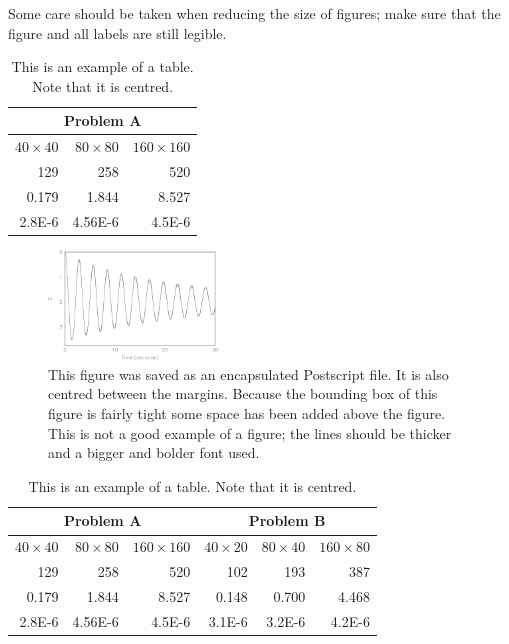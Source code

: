 \documentclass[twocolumn]{afmc_art}
\begin{document}
Some care should be taken when reducing the size of figures; make sure
that the figure and all labels are still legible.

\begin{table}[ht]
\centering
\begin{tabular}{|r|r|r|}
\hline
\multicolumn{3}{|c|}{Problem A}\\
\hline \hline
$40\times 40$&$80\times 80$&$160\times 160$\\ \hline
 129    & 258      &  520     \\
 0.179  & 1.844    & 8.527  \\
 2.8E-6 &  4.56E-6 & 4.5E-6  \\ \hline
\end{tabular}
\caption{This is an example of a table. Note that it is centred.}
\end{table}   

\begin{figure}[b]
\vspace{2mm}
\centering
\includegraphics[width=0.4\textwidth]{fig.eps}
\caption{This figure was saved as an encapsulated Postscript file. It is also centred between the 
margins. Because the bounding box of this figure is fairly tight some
space has been added above the figure. This is not a good example
of a figure; the lines should be thicker and a bigger and bolder font
used.}
\end{figure}

\begin{table}[ht]
\centering
\begin{tabular}{|r|r|r||r|r|r|}
\hline
\multicolumn{3}{|c||}{Problem A}&\multicolumn{3}{|c|}{Problem B}\\
\hline \hline
$40\times 40$&$80\times 80$&$160\times 160$&
$40\times 20$&$80\times 40$&$160\times 80$\\ \hline
 129    & 258      &  520   &   102   &   193   &  387     \\
 0.179  & 1.844    & 8.527  &   0.148 &   0.700 &  4.468   \\
 2.8E-6 &  4.56E-6 & 4.5E-6 &  3.1E-6 &  3.2E-6 &  4.2E-6  \\ \hline
\end{tabular}
\caption{This is an example of a table. Note that it is centred.}
\end{table}   
\end{document}

